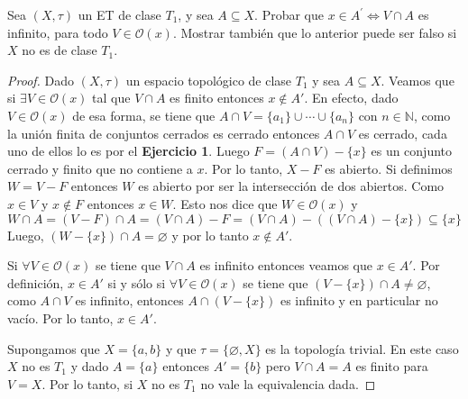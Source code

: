 \documentclass{article}
\theoremstyle{definition}
\newcommand{\N}{\mathbb{N}}
\newenvironment{ejercicio}[1]{\begin{trivlist}
\item[\hskip \labelsep {\bfseries Ejercicio}\hskip \labelsep {\bfseries #1.}]}{\end{trivlist}}
\begin{document}
\clearpage

\begin{ejercicio}{3}
    Sea \((X, \tau)\) un ET de clase \(T_{1}\), y sea \(A\subseteq X\). Probar que \(x\in A^{\prime}\iff V\cap A\) es infinito, para todo \( V \in \mathcal{O}(x)\).
    Mostrar también que lo anterior puede ser falso si \(X\) no es de clase \(T_{1}\).
\end{ejercicio}
\begin{proof}
    Dado \( (X, \tau) \) un espacio topológico de clase \( T_1\) y sea \( A \subseteq X \). Veamos que si \( \exists V \in \mathcal{O}(x) \) tal que \( V \cap A \) es finito entonces \( x \notin A' \).
    En efecto, dado \( V \in \mathcal{O}(x) \) de esa forma, se tiene que \( A \cap V = \{ a_1 \} \cup \cdots \cup \{ a_n \} \) con \( n \in \N \), como la unión finita de conjuntos cerrados es cerrado entonces \( A \cap V \) es cerrado, cada uno de ellos lo es por el \textbf{Ejercicio 1}.
    Luego \( F = (A \cap V) - \{ x \} \) es un conjunto cerrado y finito que no contiene a \( x \). Por lo tanto, \( X - F \) es abierto. Si definimos \( W = V - F \) entonces \( W \) es abierto por ser la intersección de dos abiertos.
    Como \( x \in V \) y \( x \notin F \) entonces \( x \in W \). Esto nos dice que \( W \in \mathcal{O}(x) \) y \[
        W \cap A = (V - F) \cap A = (V \cap A) - F = (V \cap A) - ((V \cap A) - \{ x \}) \subseteq \{ x \}
    \]
    Luego, \( (W - \{ x \}) \cap A = \varnothing \) y por lo tanto \( x \notin A' \).

    Si \( \forall V \in \mathcal{O}(x) \) se tiene que \( V \cap A \) es infinito entonces veamos que \( x \in A' \). Por definición, \( x \in A' \) si y sólo si \( \forall V \in \mathcal{O}(x) \) se tiene que \( (V - \{ x \}) \cap A \neq \varnothing \), como \( A \cap V \) es infinito, entonces \( A \cap (V - \{ x \}) \) es infinito y en particular no vacío. Por lo tanto, \( x \in A' \).

    Supongamos que \( X = \{ a, b \} \) y que \( \tau = \{ \varnothing, X \} \) es la topología trivial. En este caso \( X \) no es \( T_1 \) y dado \( A = \{ a \} \) entonces \( A' = \{ b \} \) pero \( V \cap A = A \) es finito para \( V = X \). Por lo tanto, si \( X \) no es \( T_1 \) no vale la equivalencia dada.
\end{proof}
\end{document}
